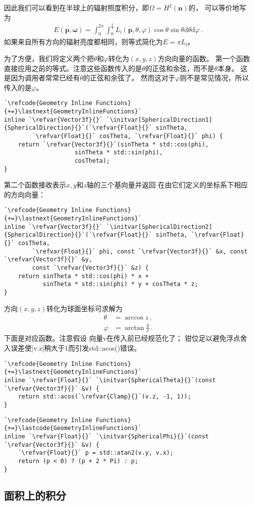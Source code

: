 因此我们可以看到在半球上的辐射照度积分，即$\Omega=H^2({\bm n})$的，
可以等价地写为
\begin{align*}
    E({\bm p},{\bm\omega})=\int_0^{2\pi}\int_0^{\frac{\pi}{2}}L_{\mathrm{i}}({\bm p},\theta,\varphi)\cos\theta\sin\theta\mathrm{d}\theta\mathrm{d}\varphi\, .
\end{align*}
如果来自所有方向的辐射亮度都相同，则等式简化为$E=\pi L_{\mathrm{i}}$。

为了方便，我们将定义两个把$\theta$和$\varphi$转化为$(x,y,z)$方向向量的函数。
第一个函数直接应用之前的等式。注意这些函数传入的是$\theta$的正弦和余弦，而不是$\theta$本身。
这是因为调用者常常已经有$\theta$的正弦和余弦了。
然而这对于$\varphi$则不是常见情况，所以传入的是$\varphi$。
\begin{lstlisting}
`\refcode{Geometry Inline Functions}{+=}\lastnext{GeometryInlineFunctions}`
inline `\refvar{Vector3f}{}` `\initvar[SphericalDirection1]{SphericalDirection}{}`(`\refvar{Float}{}` sinTheta, 
        `\refvar{Float}{}` cosTheta, `\refvar{Float}{}` phi) {
    return `\refvar{Vector3f}{}`(sinTheta * std::cos(phi), 
                    sinTheta * std::sin(phi),
                    cosTheta);
}
\end{lstlisting}

第二个函数接收表示$x,y$和$z$轴的三个基向量并返回
在由它们定义的坐标系下相应的方向向量：
\begin{lstlisting}
`\refcode{Geometry Inline Functions}{+=}\lastnext{GeometryInlineFunctions}`
inline `\refvar{Vector3f}{}` `\initvar[SphericalDirection2]{SphericalDirection}{}`(`\refvar{Float}{}` sinTheta, `\refvar{Float}{}` cosTheta, 
        `\refvar{Float}{}` phi, const `\refvar{Vector3f}{}` &x, const `\refvar{Vector3f}{}` &y,
        const `\refvar{Vector3f}{}` &z) {
    return sinTheta * std::cos(phi) * x +
           sinTheta * std::sin(phi) * y + cosTheta * z;
}
\end{lstlisting}

方向$(x,y,z)$转化为球面坐标可求解为
\begin{align*}
    \theta  & =\arccos z\, ,          \\
    \varphi & =\arctan\frac{y}{x}\, .
\end{align*}
下面是对应函数。注意假设
向量{\ttfamily v}在传入前已经规范化了；
钳位足以避免浮点舍入误差使{\ttfamily |v.z|}稍大于1而引发{\ttfamily std::acos()}错误。
\begin{lstlisting}
`\refcode{Geometry Inline Functions}{+=}\lastnext{GeometryInlineFunctions}`
inline `\refvar{Float}{}` `\initvar{SphericalTheta}{}`(const `\refvar{Vector3f}{}` &v) {
    return std::acos(`\refvar{Clamp}{}`(v.z, -1, 1));
}
\end{lstlisting}
\begin{lstlisting}
`\refcode{Geometry Inline Functions}{+=}\lastcode{GeometryInlineFunctions}`
inline `\refvar{Float}{}` `\initvar{SphericalPhi}{}`(const `\refvar{Vector3f}{}` &v) {
    `\refvar{Float}{}` p = std::atan2(v.y, v.x);
    return (p < 0) ? (p + 2 * Pi) : p;
}
\end{lstlisting}

\subsection{面积上的积分}\label{sub:面积上的积分}
